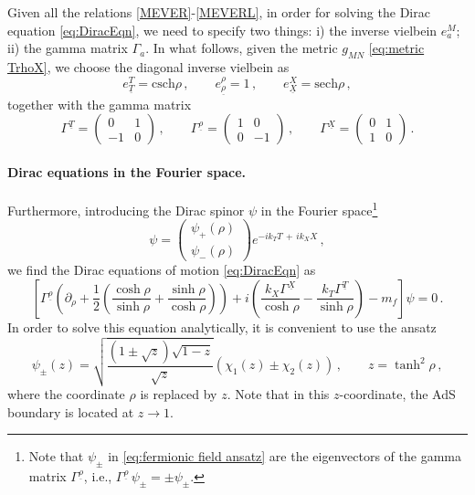\documentclass[11pt,a4paper]{article}
\newcommand{\csch}{\text{csch}}
\newcommand{\sech}{\text{sech}}
\begin{document}
Given all the relations \eqref{MEVER}-\eqref{MEVERL}, in order for solving the Dirac equation \eqref{eq:DiracEqn}, we need to specify two things: i) the inverse vielbein $e^M_a$; ii) the gamma matrix $\Gamma_a$.
In what follows, given the metric $g_{MN}$ \eqref{eq:metric TrhoX}, we choose the diagonal inverse vielbein as
\begin{equation} \label{eq:VielBein}
    e^{T}_{\underline{T}} = \csch{\rho} \,, \qquad e^{\rho}_{\underline{\rho}} = 1 \,, \qquad e^{X}_{\underline{X}} = \sech{\rho} \,,
\end{equation}
together with the gamma matrix
\begin{equation}\label{eq:Gamma Matrices}
    \Gamma^{\underline{T}}=\begin{pmatrix}
    0 & 1\\
    -1 & 0
    \end{pmatrix}\,,\qquad
    \Gamma^{\underline{\rho}}=\begin{pmatrix}
    1 & 0\\
    0 & -1
    \end{pmatrix}\,,\qquad
    \Gamma^{\underline{X}}=\begin{pmatrix}
    0 & 1\\
    1 & 0
    \end{pmatrix}\,.
\end{equation}


\paragraph{Dirac equations in the Fourier space.}
Furthermore, introducing the Dirac spinor $\psi$ in the Fourier space\footnote{Note that $\psi_{\pm}$ in \eqref{eq:fermionic field ansatz} are the eigenvectors of the gamma matrix $\Gamma^{\underline{\rho}}$, i.e., $\Gamma^{\underline{\rho}} \, \psi_{\pm}=\pm \psi_{\pm}$.}
\begin{equation} \label{eq:fermionic field ansatz}
\psi=
    \begin{pmatrix}
    \psi_+(\rho) \\ \psi_-(\rho)
    \end{pmatrix}
    e^{-i k_T T \,+\, i k_X X}\,,
\end{equation}
we find the Dirac equations of motion \eqref{eq:DiracEqn} as
\begin{equation}\label{eq:DiracEqnfour}
    \left[ \Gamma^{\underline{\rho}} \left( \partial_\rho + \frac{1}{2} \left( \frac{\cosh{\rho}}{\sinh{\rho}} + \frac{\sinh{\rho}}{\cosh{\rho}} \right) \right) + i \left( \frac{k_X \Gamma^{\underline{X}}}{\cosh{\rho}} - \frac{k_T \Gamma^{\underline{T}}}{\sinh{\rho}} \right) - m_f \right] \psi = 0\,.
\end{equation}
In order to solve this equation analytically, it is convenient to use the ansatz
\begin{equation}\label{eq:psiTochi}
\psi_\pm(z)=\sqrt{\frac{\left(1\pm\sqrt{z}\right)\sqrt{1-z}}{\sqrt{z}}}\left( \chi_1(z) \pm \chi_2(z) \right)\,, \qquad z=\tanh^2{\rho}\,,
\end{equation}
where the coordinate $\rho$ is replaced by $z$. Note that in this $z$-coordinate, the AdS boundary is located at $z\rightarrow1$.
\end{document}
